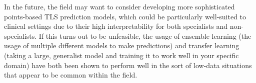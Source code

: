 \documentclass{article}
\begin{document}
In the future, the field may want to consider developing more sophisticated points-based TLS prediction models, which could be particularly well-suited to clinical settings due to their high interpretability for both specialists and non-specialists. If this turns out to be unfeasible, the usage of ensemble learning (the usage of multiple different models to make predictions) and transfer learning (taking a large, generalist model and training it to work well in your specific domain) have both been shown to perform well in the sort of low-data situations that appear to be common within the field.


      

\end{document}
